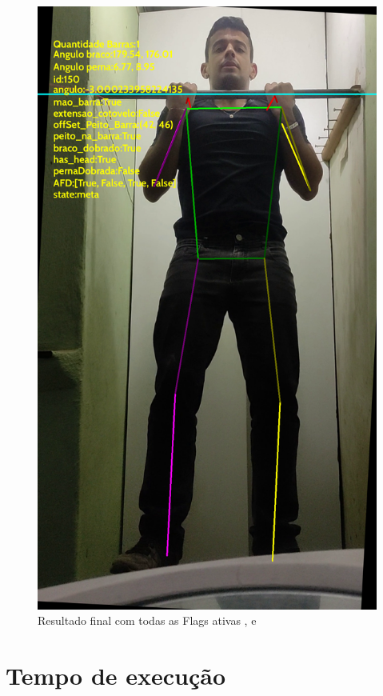 \begin{figure}[H]
	\centering
	\caption{Resultado final com todas as Flags ativas , e }
	\includegraphics[scale=0.2]{figuras/flags.png}
\end{figure}



\section[Tempo de execução]{Tempo de execução}

